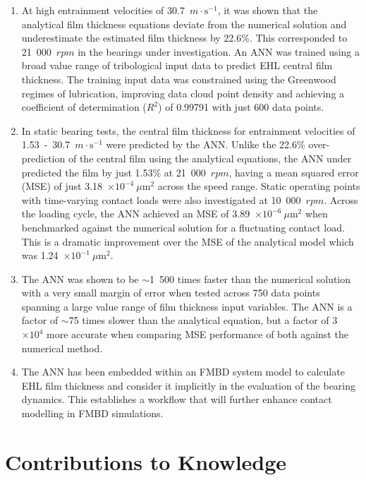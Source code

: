 \begin{enumerate}
	\item At high entrainment velocities of 30.7~$m \cdot \mathrm{s}^{-1}$, it was shown that the analytical film thickness equations deviate from the numerical solution and underestimate the estimated film thickness by 22.6\%. This corresponded to 21~000~$rpm$ in the bearings under investigation. An ANN was trained using a broad value range of tribological input data to predict EHL central film thickness. The training input data was constrained using the Greenwood regimes of lubrication, improving data cloud point density and achieving a coefficient of determination ($R^2$) of 0.99791 with just 600 data points.
	
	\item In static bearing tests, the central film thickness for entrainment velocities of 1.53~-~30.7~$m \cdot \mathrm{s}^{-1}$ were predicted by the ANN. Unlike the 22.6\% over-prediction of the central film using the analytical equations, the ANN under predicted the film by just 1.53\% at 21~000~$rpm$, having a mean squared error (MSE) of just 3.18~$\times 10^{-4}~\mu \mathrm{m}^2$ across the speed range. Static operating points with time-varying contact loads were also investigated at 10~000~$rpm$. Across the loading cycle, the ANN achieved an MSE of 3.89~$\times 10^{-6}~\mu \mathrm{m}^2$ when benchmarked against the numerical solution for a fluctuating contact load. This is a dramatic improvement over the MSE of the analytical model which was 1.24~$\times 10^{-1}~\mu\mathrm{m}^2$.
	
	\item The ANN was shown to be $\sim$1~500 times faster than the numerical solution with a very small margin of error when tested across 750 data points spanning a large value range of film thickness input variables. The ANN is a factor of $\sim$75 times slower than the analytical equation, but a factor of 3~$\times 10^{4}$ more accurate when comparing MSE performance of both against the numerical method.
	
	\item The ANN has been embedded within an FMBD system model to calculate EHL film thickness and consider it implicitly in the evaluation of the bearing dynamics. This establishes a workflow that will further enhance contact modelling in FMBD simulations.
\end{enumerate}


\section{Contributions to Knowledge} \label{Contribution to Knowledge}

